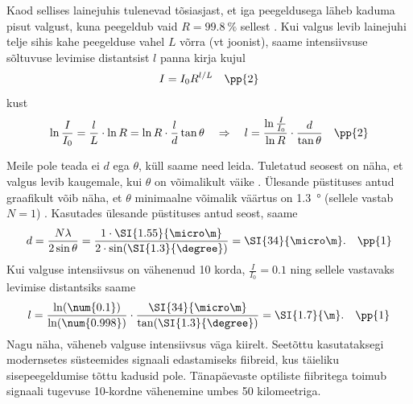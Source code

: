 Kaod sellises lainejuhis tulenevad tõsiasjast, et iga peegeldusega läheb kaduma pisut valgust, kuna peegeldub vaid $R=\SI{99.8}{\percent}$ sellest . Kui valgus levib lainejuhi telje sihis kahe peegelduse vahel $L$ võrra (vt joonist), saame intensiivsuse sõltuvuse levimise distantsist $l$ panna kirja kujul
$$I=I_0 R^{l/L} \quad \pp{2}$$
kust
$$ \ln \frac{I}{I_0}=
\frac{l}{L}  \cdot \ln R=
\ln R \cdot\frac{l}{d}\tan\theta
\quad \Rightarrow \quad
l = \frac{\ln\frac{I}{I_0}}{\ln R}\cdot\frac{d}{\tan\theta}
\quad \pp{2}$$

Meile pole teada ei $d$ ega $\theta$, küll saame need leida. Tuletatud seosest on näha, et valgus levib kaugemale, kui $\theta$ on võimalikult väike . Ülesande püstituses antud graafikult võib näha, et $\theta$ minimaalne võimalik väärtus on \SI{1.3}{\degree} (sellele vastab $N=1$) . Kasutades ülesande püstituses antud seost, saame
$$d = \frac{N\lambda}{2\sin\theta}=\frac{1\cdot\SI{1.55}{\micro\m}}{2\cdot\sin(\SI{1.3}{\degree})}=\SI{34}{\micro\m}. \quad \pp{1}$$
Kui valguse intensiivsus on vähenenud 10 korda, $\frac{I}{I_0}=0.1$  ning sellele vastavaks levimise distantsiks saame
$$l=\frac{\ln(\num{0.1})}{\ln(\num{0.998})}\cdot\frac{\SI{34}{\micro\m}}{\tan(\SI{1.3}{\degree})}=\SI{1.7}{\m}. \quad \pp{1}$$
Nagu näha, väheneb valguse intensiivsus väga kiirelt. Seetõttu kasutataksegi modernsetes süsteemides signaali edastamiseks fiibreid, kus täieliku sisepeegeldumise tõttu kadusid pole. Tänapäevaste optiliste fiibritega toimub signaali tugevuse 10-kordne vähenemine umbes 50 kilomeetriga.
\probend